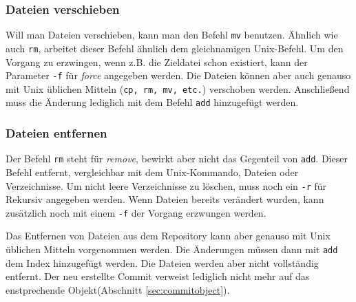 \subsubsection{Dateien verschieben} Will man Dateien verschieben, kann man den
Befehl \texttt{mv} benutzen. Ähnlich wie auch \texttt{rm}, arbeitet dieser
Befehl ähnlich dem gleichnamigen Unix-Befehl. Um den Vorgang zu erzwingen, wenn
z.B.  die Zieldatei schon existiert, kann der Parameter \texttt{-f} für
\textit{force} angegeben werden. Die Dateien können aber auch genauso mit Unix
üblichen Mitteln (\texttt{cp, rm, mv, etc.}) verschoben werden. Anschließend
muss die Änderung lediglich mit dem Befehl \texttt{add} hinzugefügt
werden.\cite[S.~43-44]{gitosp}


\subsubsection{Dateien entfernen}
Der Befehl \texttt{rm} steht für \textit{remove}, bewirkt aber nicht das
Gegenteil von \texttt{add}. Dieser Befehl entfernt, vergleichbar mit dem
Unix-Kommando, Dateien oder Verzeichnisse. Um nicht leere Verzeichnisse zu
löschen, muss noch ein \texttt{-r} für Rekursiv angegeben werden. Wenn Dateien
bereits verändert wurden, kann zusätzlich noch mit einem \texttt{-f} der
Vorgang erzwungen werden.


Das Entfernen von Dateien aus dem Repository kann aber genauso mit Unix
üblichen Mitteln vorgenommen werden. Die Änderungen müssen dann mit
\texttt{add} dem Index hinzugefügt werden. Die Dateien werden aber nicht
vollständig entfernt. Der neu erstellte Commit verweist lediglich nicht mehr
auf das enstprechende Objekt(Abschnitt
\ref{sec:commitobject}).\cite[S.~43-44]{gitosp}

